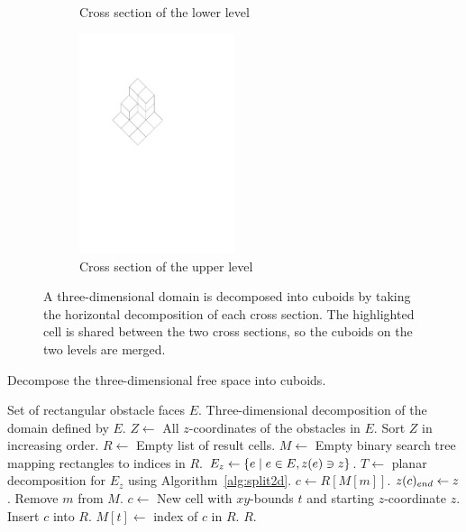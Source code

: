 \documentclass[english,gradu]{tktltiki2018}
\begin{document}
\begin{figure}
\begin{subfigure}[t]{0.3\textwidth}
		\caption{Cross section of the lower level}
	\end{subfigure}
	\hfil
	\begin{subfigure}[t]{0.3\textwidth}\centering
		\includegraphics[width=0.5\textwidth,page=4]{fig/split3d}
		\caption{Cross section of the upper level}
	\end{subfigure}
	\caption{A three-dimensional domain is decomposed into cuboids by taking the horizontal decomposition of each cross section. The highlighted cell is shared between the two cross sections, so the cuboids on the two levels are merged.}\label{fig:split3d}
\end{figure}

\begin{algorithm}
\caption{Decompose the three-dimensional free space into cuboids.}\label{alg:split3d}
\begin{algorithmic}
\Require Set of rectangular obstacle faces $E$.
\Output Three-dimensional decomposition of the domain defined by $E$.
\State $Z\gets$ All $z$-coordinates of the obstacles in $E$.
\State Sort $Z$ in increasing order.
\State $R\gets$ Empty list of result cells.
\State $M\gets$ Empty binary search tree mapping rectangles to indices in $R$.
	\State $E_z\gets\left\{e \mid e\in E, z(e)\ni z\right\}$.
	\State $T\gets$ planar decomposition for $E_z$ using Algorithm~\ref{alg:split2d}.
		\State $c\gets R[M[m]]$.
		\State $z(c)_{end}\gets z$.
		\State Remove $m$ from $M$.
	\EndFor
		\State $c\gets$ New cell with $xy$-bounds $t$ and starting $z$-coordinate $z$.
		\State Insert $c$ into $R$.
		\State $M[t]\gets$ index of $c$ in $R$.
	\EndFor
\EndFor
\State \Return $R$.
\end{algorithmic}
\end{algorithm}
\end{document}
